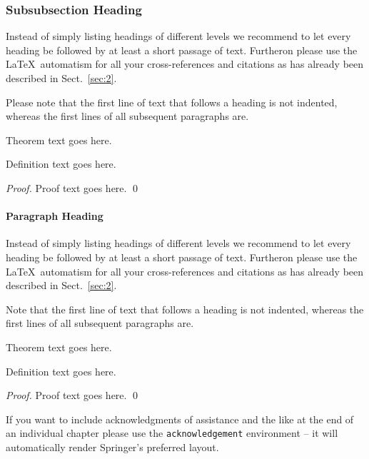 \subsubsection{Subsubsection Heading}
Instead of simply listing headings of different levels we recommend to let every heading be followed by at least a short passage of text. Furtheron please use the \LaTeX\ automatism for all your cross-references and citations as has already been described in Sect.~\ref{sec:2}.

Please note that the first line of text that follows a heading is not indented, whereas the first lines of all subsequent paragraphs are.

\begin{theorem}
Theorem text goes here.
\end{theorem}
%
%
\begin{definition}
Definition text goes here.
\end{definition}

\begin{proof}
Proof text goes here.
\qed
\end{proof}

\paragraph{Paragraph Heading} %
Instead of simply listing headings of different levels we recommend to let every heading be followed by at least a short passage of text. Furtheron please use the \LaTeX\ automatism for all your cross-references and citations as has already been described in Sect.~\ref{sec:2}.

Note that the first line of text that follows a heading is not indented, whereas the first lines of all subsequent paragraphs are.
%
%
\begin{theorem}
Theorem text goes here.
\end{theorem}
%
\begin{definition}
Definition text goes here.
\end{definition}
%
\begin{proof}
\smartqed
Proof text goes here.
\qed
\end{proof}
%
\begin{acknowledgement}
If you want to include acknowledgments of assistance and the like at the end of an individual chapter please use the \verb|acknowledgement| environment -- it will automatically render Springer's preferred layout.
\end{acknowledgement}
%
